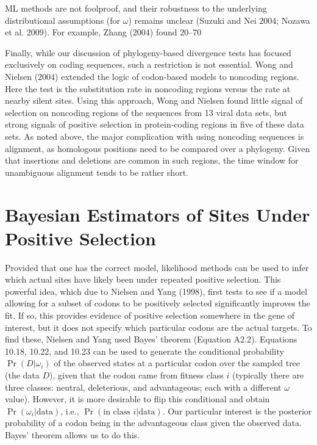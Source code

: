 \documentclass{article}
\begin{document}
ML methods are not foolproof, and their robustness to the underlying distributional assumptions (for  $ \omega $) remains unclear (Suzuki and Nei 2004; Nozawa et al. 2009). For example, Zhang (2004) found 20–70%

Finally, while our discussion of phylogeny-based divergence tests has focused exclusively on coding sequences, such a restriction is not essential. Wong and Nielsen (2004) extended the logic of codon-based models to noncoding regions. Here the test is the substitution rate in noncoding regions versus the rate at nearby silent sites. Using this approach, Wong and Nielsen found little signal of selection on noncoding regions of the sequences from 13 viral data sets, but strong signals of positive selection in protein-coding regions in five of these data sets. As noted above, the major complication with using noncoding sequences is alignment, as homologous positions need to be compared over a phylogeny. Given that insertions and deletions are common in such regions, the time window for unambiguous alignment tends to be rather short.

\section{Bayesian Estimators of Sites Under Positive Selection}
Provided that one has the correct model, likelihood methods can be used to infer which actual sites have likely been under repeated positive selection. This powerful idea, which due to Nielsen and Yang (1998), first tests to see if a model allowing for a subset of codons to be positively selected significantly improves the fit. If so, this provides evidence of positive selection somewhere in the gene of interest, but it does not specify which particular codons are the actual targets. To find these, Nielsen and Yang used Bayes' theorem (Equation A2.2). Equations 10.18, 10.22, and 10.23 can be used to generate the conditional probability  $ \Pr(D|\omega_i) $ of the observed states at a particular codon over the sampled tree (the data  $ D $), given that the codon came from fitness class  $ i $ (typically there are three classes: neutral, deleterious, and advantageous; each with a different  $ \omega $ value). However, it is more desirable to flip this conditional and obtain  $ \Pr(\omega_i|\text{data}) $, i.e.,  $ \Pr(\text{in class } i|\text{data}) $. Our particular interest is the posterior probability of a codon being in the advantageous class given the observed data. Bayes' theorem allows us to do this.
\end{document}
